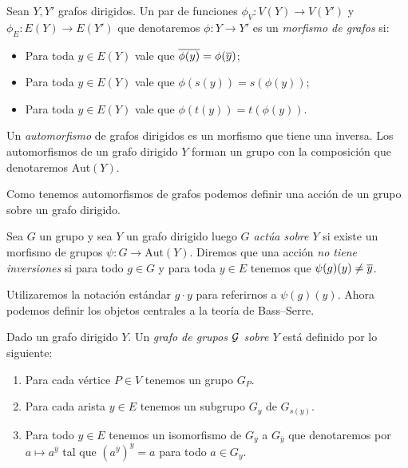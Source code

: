 \documentclass[tesis.tex]{subfiles}
\begin{document}

\begin{deff}
	Sean $Y, Y'$ grafos dirigidos. 
	Un par de funciones $\phi_V:V(Y) \to V(Y')$ y $\phi_E: E(Y) \to E(Y')$ que denotaremos $\phi:Y \to Y'$ es un \emph{morfismo de grafos} si:
	\begin{itemize}
		\item Para toda $y \in E(Y)$ vale que $\overline{\phi(y)} = \phi(\overline y)$;
		\item Para toda $y \in E(Y)$ vale que $\phi(s(y)) = s(\phi(y))$;
		\item Para toda $y \in E(Y)$ vale que $\phi(t(y)) = t(\phi(y))$.
	\end{itemize}   
\end{deff}

Un \emph{automorfismo} de grafos dirigidos es un morfismo que tiene una inversa.
Los automorfismos de un grafo dirigido $Y$ forman un grupo con la composición que denotaremos Aut$(Y)$.

Como tenemos automorfismos de grafos podemos definir una acción de un grupo sobre un grafo dirigido.
\begin{deff}
	Sea $G$ un grupo y sea $Y$ un grafo dirigido luego \emph{$G$ actúa sobre $Y$} si existe un morfismo de grupos $\psi: G \to \text{Aut}(Y)$.
	Diremos que una acción \emph{no tiene inversiones} si para todo $g \in G$ y para toda $y \in E$ tenemos que $\psi(g)(y) \neq \overline y$.
\end{deff}

Utilizaremos la notación estándar $g \cdot y$ para referirnos a $\psi(g)(y)$.
Ahora podemos definir los objetos centrales a la teoría de Bass--Serre.

\begin{deff}
	Dado un grafo dirigido $Y$.
	Un \emph{grafo de grupos $\cal G$ sobre $Y$} está definido por lo siguiente:
	\begin{enumerate}
		\item Para cada vértice $P \in V$ tenemos un grupo $G_P$.
		\item  Para cada arista $y \in E$ tenemos un subgrupo $G_y$ de $G_{s(y)}$.
		\item Para todo $y \in E$ tenemos un isomorfismo de $G_y$ a $G_{\overline y}$ que denotaremos por $a \mapsto a^{\overline y} $ tal que $(a^{\overline y})^y  = a$ para todo $a \in G_y$.
	\end{enumerate}
\end{deff}
\end{document}
